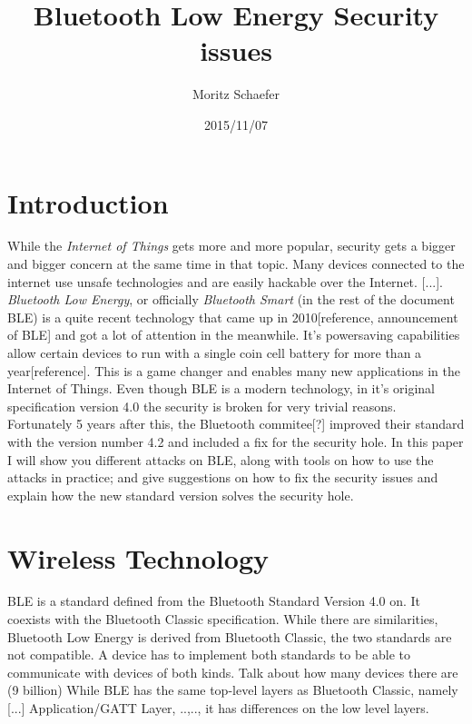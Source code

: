 \documentclass[a4paper]{scrartcl}
\begin{document}
\title{Bluetooth Low Energy {\textendash} Security issues}
\author{Moritz Schaefer}
\date{2015/11/07}

\maketitle

\section{Introduction}
While the \emph{Internet of Things} gets more and more popular, security gets a bigger and bigger concern at the same time in that topic. Many devices connected to the internet use unsafe technologies and are easily hackable over the Internet. [...]. \emph{Bluetooth Low Energy}, or officially \emph{Bluetooth Smart} (in the rest of the document BLE) is a quite recent technology that came up in 2010[reference, announcement of BLE] and got a lot of attention in the meanwhile. It's powersaving capabilities allow certain devices to run with a single coin cell battery for more than a year[reference]. This is a game changer and enables many new applications in the Internet of Things. Even though BLE is a modern technology, in it's original specification version 4.0 the security is broken for very trivial reasons. Fortunately 5 years after this, the Bluetooth commitee[?] improved their standard with the version number 4.2 and included a fix for the security hole. In this paper I will show you different attacks on BLE, along with tools on how to use the attacks in practice; and give suggestions on how to fix the security issues and explain how the new standard version solves the security hole.

\section{Wireless Technology}

BLE is a standard defined from the Bluetooth Standard Version 4.0 on. It coexists with the Bluetooth Classic specification. While there are similarities, Bluetooth Low Energy is derived from Bluetooth Classic, the two standards are not compatible. A device has to implement both standards to be able to communicate with devices of both kinds.
Talk about how many devices there are (9 billion)
While BLE has the same top-level layers as Bluetooth Classic, namely [...] Application/GATT Layer, ..,.., it has differences on the low level layers.
\end{document}
